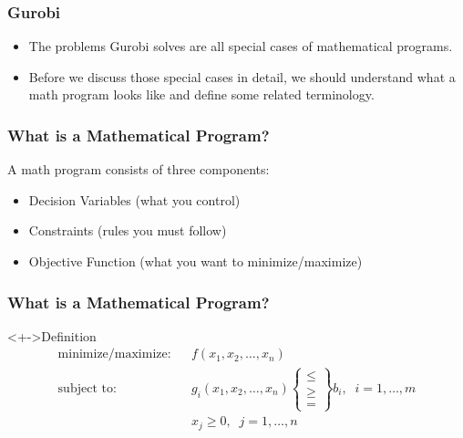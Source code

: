 \documentclass[12pt,handout]{beamer}
\begin{document}
\begin{frame}
\frametitle{Gurobi}
\begin{itemize}
\item The problems Gurobi solves are all special cases of mathematical programs.
\item Before we discuss those special cases in detail, we should understand what a math program looks like and define some related terminology.
\end{itemize}
\end{frame}

\begin{frame}
\frametitle{What is a Mathematical Program?}
A math program consists of three components:
\begin{itemize}
\item Decision Variables (what you control)
\item Constraints (rules you must follow)
\item Objective Function (what you want to minimize/maximize)
\end{itemize}
\end{frame}

\begin{frame}
\frametitle{What is a Mathematical Program?}
\begin{block}<+->{Definition}
\begin{eqnarray}
\mbox{minimize/maximize:} && f(x_1, x_2, \ldots, x_n) \nonumber \\
\mbox{subject to:} && g_i(x_1, x_2, \ldots, x_n)
\begin{Bmatrix}   \le \\
                   \ge \\
                   =
\end{Bmatrix}
b_i, \;\; i = 1, \ldots, m \nonumber \\
&& x_j \ge 0,\;\;j = 1, \ldots, n \nonumber
\end{eqnarray}
\end{block}
\end{frame}
\end{document}
